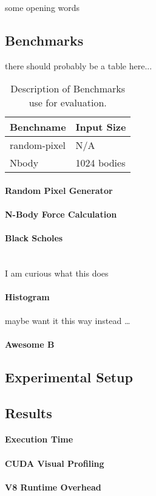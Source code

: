 
some opening words

\subsection{Benchmarks}
there should probably be a table here...
\begin{table}
\begin{center}
\begin{tabular}{| l | l |}
\hline
Benchname & Input Size \\
\hline
random-pixel & N/A \\
\hline
Nbody &  1024 bodies \\
\hline
\end{tabular}
\end{center}
\caption{Description of Benchmarks use for evaluation.}
\label{benchmark-table}
\end{table}

\paragraph{Random Pixel Generator}

\paragraph{N-Body Force Calculation}

\paragraph{Black Scholes} \hspace{0pt}\\
I am curious what this does


\paragraph{Histogram}
maybe want it this way instead \ldots

\paragraph{Awesome B}

\subsection{Experimental Setup}

\subsection{Results}

\paragraph{Execution Time}
\paragraph{CUDA Visual Profiling}
\paragraph{V8 Runtime Overhead}
